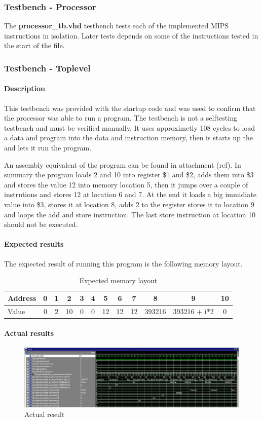 \subsubsection{Testbench - Processor}
The {\bf processor\_tb.vhd} testbench tests each of the implemented MIPS instructions in isolation. Later tests depends on some of the instructions tested in the start of the file.
\subsubsection{Testbench - Toplevel}

\paragraph{Description}

This testbench was provided with the startup code and was used to confirm that the processor was able to run a program. The testbench is not a selftesting testbench and must be verified manually. It uses approximetly 108 cycles to load a data and program into the data and instruction memory, then is starts up the and lets it run the program.

An assembly equivalent of the program can be found in attachment (ref).
In summary the program loads 2 and 10 into register \$1 and \$2, adds them into \$3 and stores the value 12 into memory location 5, then it jumps over a couple of instrutions and stores 12 at location 6 and 7. At the end it loads a big immidiate value into \$3, stores it at location 8, adds 2 to the register stores it to location 9 and loops the add and store instruction. The last store instruction at location 10 should not be executed.

\paragraph{Expected results}

The expected result of running this program is the following memory layout. 
\begin{table}[h]
	\begin{tabular}{|l|c|c|c|c|c|c|c|c|c|c|c|}
		\hline
		Address &  0 &  1 &  2 &  3 &  4 &  5 &  6 &  7 &  8 &  9 & 10 \\
		\hline
		Value   &  0 &  2 & 10 &  0 & 0 & 12  & 12 & 12 & 393216 & 393216 + i*2 & 0\\
		\hline
	\end{tabular}
	\caption{Expected memory layout}
\end{table}

\paragraph{Actual results}


\begin{figure}[h]
		\centerline{\includegraphics[width=550px]{figures/toplevel_tb_result}}
		\caption{Actual result}
\end{figure}

